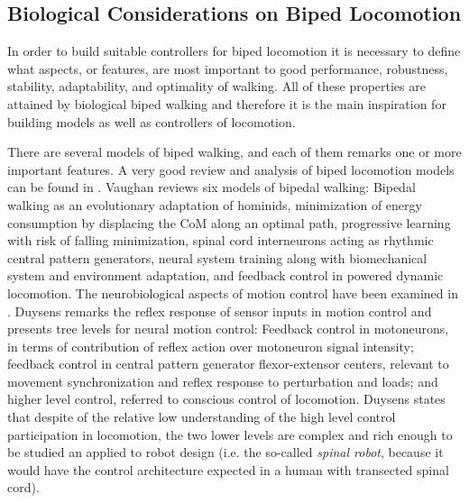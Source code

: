 \subsection{Biological Considerations on Biped Locomotion}


In order to build suitable controllers for biped locomotion it is
necessary to define what aspects, or features, are most important to
good performance, robustness, stability, adaptability, and optimality
of walking. All of these properties are attained by biological biped
walking and therefore it is the main inspiration for building models
as well as controllers of locomotion.


There are several models of biped walking, and each of them remarks
one or more important features. A very good review and analysis of
biped locomotion models can be found in
\cite{Vaughan03Theories}. Vaughan reviews six models of bipedal
walking: Bipedal walking as an evolutionary adaptation of hominids,
minimization of energy consumption by displacing the CoM along an
optimal path, progressive learning with risk of falling minimization,
spinal cord interneurons acting as rhythmic central pattern
generators, neural system training along with biomechanical system and
environment adaptation, and feedback control in powered dynamic
locomotion. The neurobiological aspects of motion control have been
examined in \cite{Duysens02walking}. Duysens remarks the reflex
response of sensor inputs in motion control and presents tree levels
for neural motion control: Feedback control in motoneurons, in terms
of contribution of reflex action over motoneuron signal intensity;
feedback control in central pattern generator flexor-extensor centers,
relevant to movement synchronization and reflex response to
perturbation and loads; and higher level control, referred to
conscious control of locomotion. Duysens states that despite of the
relative low understanding of the high level control participation in
locomotion, the two lower levels are complex and rich enough to be
studied an applied to robot design (i.e. the so-called {\it spinal
  robot}, because it would have the control architecture expected in a
human with transected spinal cord).







